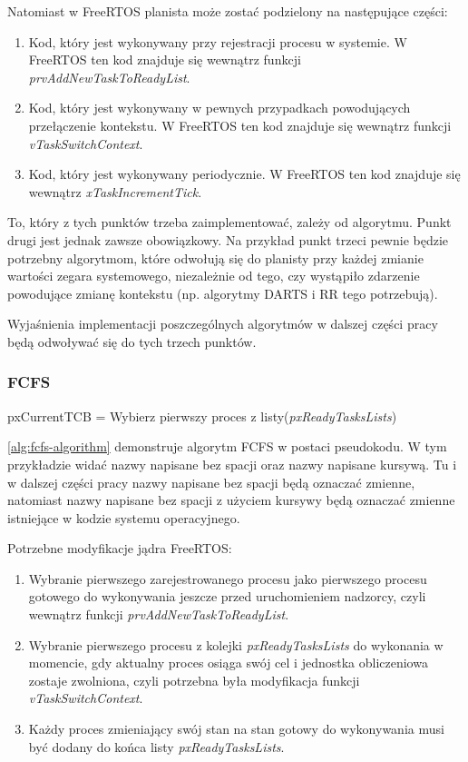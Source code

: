 \documentclass[../../main]{subfiles}
\begin{document}
Natomiast w FreeRTOS planista może zostać podzielony na następujące części:

\begin{enumerate}
    \item Kod, który jest wykonywany przy rejestracji procesu w systemie. W FreeRTOS ten kod znajduje się wewnątrz funkcji \textit{prvAddNewTaskToReadyList}.
    \item Kod, który jest wykonywany w pewnych przypadkach powodujących przełączenie kontekstu. W FreeRTOS ten kod znajduje się wewnątrz funkcji \textit{vTaskSwitchContext}.
    \item Kod, który jest wykonywany periodycznie. W FreeRTOS ten kod znajduje się wewnątrz \textit{xTaskIncrementTick}.
\end{enumerate}

To, który z tych punktów trzeba zaimplementować, zależy od algorytmu. Punkt drugi jest jednak zawsze obowiązkowy. Na przykład punkt trzeci pewnie będzie potrzebny algorytmom, które odwołują się do planisty przy każdej zmianie wartości zegara systemowego, niezależnie od tego, czy wystąpiło zdarzenie powodujące zmianę kontekstu (np. algorytmy DARTS i RR tego potrzebują).

Wyjaśnienia implementacji poszczególnych algorytmów w dalszej części pracy będą odwoływać się do tych trzech punktów.

\subsubsection{FCFS}

\begin{algorithm}
\caption{Pseudokod algorytmu FCFS}\label{alg:fcfs-algorithm}
\begin{algorithmic}[1]
\State pxCurrentTCB = Wybierz pierwszy proces z listy(\textit{pxReadyTasksLists})
\end{algorithmic}
\end{algorithm}

\cref{alg:fcfs-algorithm} demonstruje algorytm FCFS w postaci pseudokodu. W tym przykładzie widać nazwy napisane bez spacji oraz nazwy napisane kursywą. Tu i w dalszej części pracy nazwy napisane bez spacji będą oznaczać zmienne, natomiast nazwy napisane bez spacji z użyciem kursywy będą oznaczać zmienne istniejące w kodzie systemu operacyjnego.

Potrzebne modyfikacje jądra FreeRTOS:

\begin{enumerate}
    \item Wybranie pierwszego zarejestrowanego procesu jako pierwszego procesu gotowego do wykonywania jeszcze przed uruchomieniem nadzorcy, czyli wewnątrz funkcji \textit{prvAddNewTaskToReadyList}.
    \item Wybranie pierwszego procesu z kolejki \textit{pxReadyTasksLists} do wykonania w momencie, gdy aktualny proces osiąga swój cel i jednostka obliczeniowa zostaje zwolniona, czyli potrzebna była modyfikacja funkcji \textit{vTaskSwitchContext}.
    \item Każdy proces zmieniający swój stan na stan gotowy do wykonywania musi być dodany do końca listy \textit{pxReadyTasksLists}.
\end{enumerate}
\end{document}
